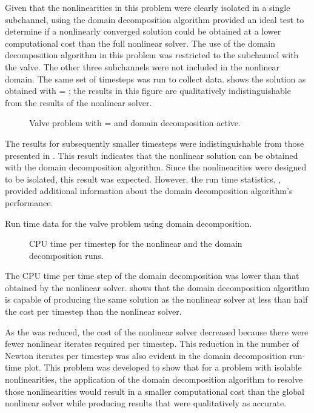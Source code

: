 Given that the nonlinearities in this problem were clearly isolated in a single subchannel, using the domain decomposition algorithm provided an ideal test to determine if a nonlinearly converged solution could be obtained at a lower computational cost than the full nonlinear solver.
The use of the domain decomposition algorithm in this problem was restricted to the subchannel with the valve.
The other three subchannels were not included in the nonlinear domain.
The same set of timesteps was run to collect data.
 shows the solution as obtained with \dtmax{} = ; the results in this figure are qualitatively indistinguishable from the results of the nonlinear solver.

\begin{figure}[h!tb]
\centering

\caption{Valve problem with \dtmax{} =  and domain decomposition active.}
\label{fig:valveDom6pt25em02}
\end{figure}

The results for subsequently smaller timesteps were indistinguishable from those presented in .
This result indicates that the nonlinear solution can be obtained with the domain decomposition algorithm.
Since the nonlinearities were designed to be isolated, this result was expected.
However, the run time statistics, , provided additional information about the domain decomposition algorithm's performance.

\begin{table}[h!tb]
\centering
\singlespace

\caption{Run time data for the valve problem using domain decomposition.}
\label{tab:valveDomTable}
\end{table}

\begin{figure}[h!tb]
\centering

\caption{CPU time per timestep for the nonlinear and the domain decomposition runs.}
\label{fig:valveRunTime}
\end{figure}

The CPU time per time step of the domain decomposition was lower than that obtained by the nonlinear solver.
 shows that the domain decomposition algorithm is capable of producing the same solution as the nonlinear solver at less than half the cost per timestep than the nonlinear solver.

As the \dtmax{} was reduced, the cost of the nonlinear solver decreased because there were fewer nonlinear iterates required per timestep.
This reduction in the number of Newton iterates per timestep was also evident in the domain decomposition run-time plot.
This problem was developed to show that for a problem with isolable nonlinearities, the application of the domain decomposition algorithm to resolve those nonlinearities would result in a smaller computational cost than the global nonlinear solver while producing results that were qualitatively as accurate.

